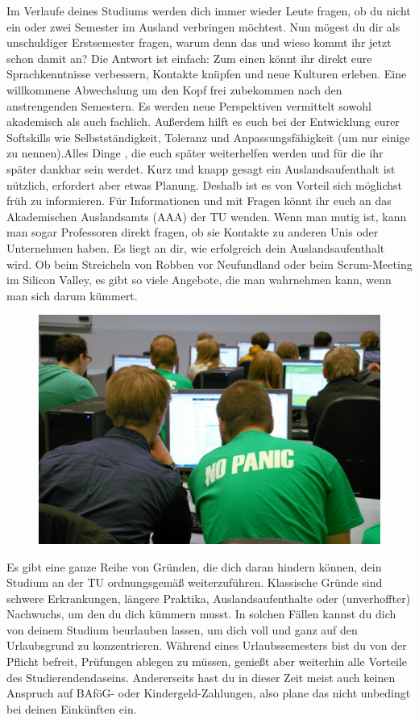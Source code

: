 Im Verlaufe deines Studiums werden dich immer wieder Leute fragen, ob du nicht ein oder zwei Semester im Ausland verbringen möchtest. 
Nun mögest du dir als unschuldiger Erstsemester fragen, warum denn das und wieso kommt ihr jetzt schon damit an? 
Die Antwort ist einfach:
Zum einen könnt ihr direkt eure Sprachkenntnisse verbessern, Kontakte knüpfen und neue Kulturen erleben. Eine willkommene Abwechslung  um den Kopf frei zubekommen nach den anstrengenden Semestern. Es werden neue Perspektiven vermittelt sowohl akademisch als auch fachlich. Außerdem hilft es euch bei der Entwicklung eurer Softskills wie Selbstständigkeit, Toleranz und Anpassungsfähigkeit (um nur einige zu nennen).Alles Dinge , die euch später weiterhelfen werden und für die ihr später dankbar sein werdet.
Kurz und knapp gesagt ein Auslandsaufenthalt ist nützlich, erfordert aber etwas Planung. 
Deshalb ist es von Vorteil sich möglichst früh zu informieren.
Für Informationen und mit Fragen könnt ihr euch an das Akademischen Auslandsamts (AAA) der TU  wenden. 
Wenn man mutig ist, kann man sogar Professoren direkt fragen, ob sie Kontakte zu anderen Unis oder Unternehmen haben. 
Es liegt an dir, wie erfolgreich dein Auslandsaufenthalt wird. 
Ob beim Streicheln von Robben vor Neufundland oder beim Scrum-Meeting im Silicon Valley, es gibt so viele Angebote, die man wahrnehmen kann, wenn man sich darum kümmert.

\begin{figure}[b!]
	\centering
	\includegraphics[width=0.9\linewidth]{img/ese2014/einschreibung.jpg}
\end{figure}%

Es gibt eine ganze Reihe von Gründen, die dich daran hindern können, dein Studium an der TU ordnungsgemäß weiterzuführen.
Klassische Gründe sind schwere Erkrankungen, längere Praktika, Auslandsaufenthalte oder (unverhoffter) Nachwuchs, um den du dich kümmern musst.
In solchen Fällen kannst du dich von deinem Studium beurlauben lassen, um dich voll und ganz auf den Urlaubsgrund zu konzentrieren.
Während eines Urlaubssemesters bist du von der Pflicht befreit, Prüfungen ablegen zu müssen, genießt aber weiterhin alle Vorteile des Studierendendaseins.
Andererseits hast du in dieser Zeit meist auch keinen Anspruch auf BAföG- oder Kindergeld-Zahlungen, also plane das nicht unbedingt bei deinen Einkünften ein.

